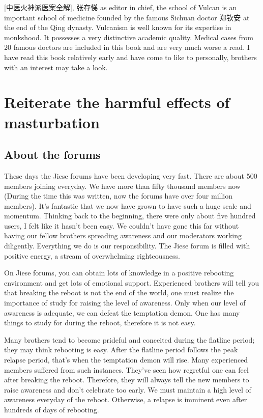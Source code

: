 \documentclass[
]{book}
\begin{document}
{[}中医火神派医案全解{]}, 张存悌 as editor in chief, the school of Vulcan is an important school of medicine founded by the famous Sichuan doctor 郑钦安 at the end of the Qing dynasty. Vulcanism is well known for its expertise in monkshood. It possesses a very distinctive academic quality. Medical cases from 20 famous doctors are included in this book and are very much worse a read. I have read this book relatively early and have come to like to personally, brothers with an interest may take a look.

\hypertarget{reiterate-the-harmful-effects-of-masturbation}{%
\chapter{Reiterate the harmful effects of masturbation}\label{reiterate-the-harmful-effects-of-masturbation}}

\hypertarget{about-the-forums}{%
\section{About the forums}\label{about-the-forums}}

These days the Jiese forums have been developing very fast. There are about 500 members joining everyday. We have more than fifty thousand members now (During the time this was written, now the forums have over four million members). It's fantastic that we now have grown to have such a huge scale and momentum. Thinking back to the beginning, there were only about five hundred users, I felt like it hasn't been easy. We couldn't have gone this far without having our fellow brothers spreading awareness and our moderators working diligently. Everything we do is our responsibility. The Jiese forum is filled with positive energy, a stream of overwhelming righteousness.

On Jiese forums, you can obtain lots of knowledge in a positive rebooting environment and get lots of emotional support. Experienced brothers will tell you that breaking the reboot is not the end of the world, one must realize the importance of study for raising the level of awareness. Only when our level of awareness is adequate, we can defeat the temptation demon. One has many things to study for during the reboot, therefore it is not easy.

Many brothers tend to become prideful and conceited during the flatline period; they may think rebooting is easy. After the flatline period follows the peak relapse period, that's when the temptation demon will rise. Many experienced members suffered from such instances. They've seen how regretful one can feel after breaking the reboot. Therefore, they will always tell the new members to raise awareness and don't celebrate too early. We must maintain a high level of awareness everyday of the reboot. Otherwise, a relapse is imminent even after hundreds of days of rebooting.
\end{document}
